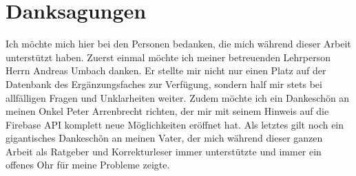 \documentclass[../main.tex]{subfiles}
\begin{document}
\section*{Danksagungen}
Ich möchte mich hier bei den Personen bedanken, die mich während dieser Arbeit unterstützt haben. Zuerst einmal möchte ich meiner betreuenden Lehrperson Herrn Andreas Umbach danken. Er stellte mir nicht nur einen Platz auf der Datenbank des Ergänzungsfaches zur Verfügung, sondern half mir stets bei allfälligen Fragen und Unklarheiten weiter. Zudem möchte ich ein Dankeschön an  meinen Onkel Peter Arrenbrecht richten, der mir mit seinem Hinweis auf die Firebase API komplett neue Möglichkeiten eröffnet hat. Als letztes gilt noch ein gigantisches Dankeschön an meinen Vater, der mich während dieser ganzen Arbeit als Ratgeber und Korrekturleser immer unterstützte und immer ein offenes Ohr für meine Probleme zeigte.
\end{document}
